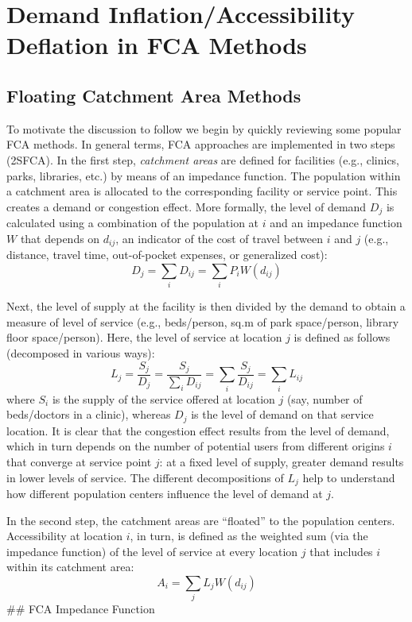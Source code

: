 \documentclass[10pt,letterpaper]{article}
\begin{document}
\section{Demand Inflation/Accessibility Deflation in FCA
Methods}\label{demand-inflationaccessibility-deflation-in-fca-methods}

\subsection{Floating Catchment Area
Methods}\label{floating-catchment-area-methods}

To motivate the discussion to follow we begin by quickly reviewing some
popular FCA methods. In general terms, FCA approaches are implemented in
two steps (2SFCA). In the first step, \emph{catchment areas} are defined
for facilities (e.g., clinics, parks, libraries, etc.) by means of an
impedance function. The population within a catchment area is allocated
to the corresponding facility or service point. This creates a demand or
congestion effect. More formally, the level of demand \(D_{j}\) is
calculated using a combination of the population at \(i\) and an
impedance function \(W\) that depends on \(d_{ij}\), an indicator of the
cost of travel between \(i\) and \(j\) (e.g., distance, travel time,
out-of-pocket expenses, or generalized cost): \[
D_j = \sum_i{D_{ij}} = \sum_i{P_iW(d_{ij})}
\]

Next, the level of supply at the facility is then divided by the demand
to obtain a measure of level of service (e.g., beds/person, sq.m of park
space/person, library floor space/person). Here, the level of service at
location \(j\) is defined as follows (decomposed in various ways): \[
L_j = \frac{S_j}{D_j} = \frac{S_j}{\sum_iD_{ij}} = \sum_i\frac{S_j}{D_{ij}}=\sum_iL_{ij}
\] where \(S_i\) is the supply of the service offered at location \(j\)
(say, number of beds/doctors in a clinic), whereas \(D_j\) is the level
of demand on that service location. It is clear that the congestion
effect results from the level of demand, which in turn depends on the
number of potential users from different origins \(i\) that converge at
service point \(j\): at a fixed level of supply, greater demand results
in lower levels of service. The different decompositions of \(L_j\) help
to understand how different population centers influence the level of
demand at \(j\).

In the second step, the catchment areas are ``floated'' to the
population centers. Accessibility at location \(i\), in turn, is defined
as the weighted sum (via the impedance function) of the level of service
at every location \(j\) that includes \(i\) within its catchment area:
\[
A_i = \sum_j{L_jW(d_{ij})}
\] \#\# FCA Impedance Function
\end{document}
